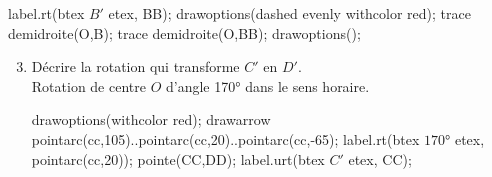 \begin{corrige}
\begin{enumerate}
\begin{Geometrie}[CoinHD={(7u,6u)}]
                label.rt(btex $B'$ etex, BB);    
                drawoptions(dashed evenly withcolor red);
                trace demidroite(O,B);
                trace demidroite(O,BB);
                drawoptions();
            \end{Geometrie}
    \end{enumerate}
    \Coupe 
    \begin{enumerate}            
        \setcounter{enumi}{2}
            \begin{Geometrie}[CoinHD={(7u,6u)}]    
                \enonceTroisiemeGTroisExoDix
                trace rapporteurdouble(O,C,-1);
                drawoptions(withcolor red);
                drawarrow pointarc(cc,150)..pointarc(cc,127.5)..pointarc(cc,105);
                label.ulft(btex $\ang{45}$ etex, pointarc(cc,127.5));    
                pointe(CC);
                label.urt(btex $C'$ etex, CC);
                drawoptions(dashed evenly withcolor red);
                trace demidroite(O,C);
                trace demidroite(O,CC);
                drawoptions();
            \end{Geometrie}
            \begin{Geometrie}[CoinHD={(7u,6u)}]    
                \enonceTroisiemeGTroisExoDix
                trace rapporteurdouble(O,E,-1);
                drawoptions(withcolor red);
                drawarrow pointarc(cc,300)..pointarc(cc,277.5)..pointarc(cc,255);
                label.bot(btex $\ang{45}$ etex, pointarc(cc,277.5));    
                pointe(EE);
                label.lrt(btex $E'$ etex, EE);
                drawoptions(dashed evenly withcolor red);
                trace demidroite(O,E);
                trace demidroite(O,EE);
                drawoptions();
            \end{Geometrie}
            \item Décrire la rotation qui transforme $C'$ en $D'$.\\
        {\red Rotation de centre $O$ d'angle \ang{170} dans le sens horaire.}\\
            \begin{Geometrie}[CoinHD={(7u,6u)}]    
                \enonceTroisiemeGTroisExoDix
                drawoptions(withcolor red);
                drawarrow pointarc(cc,105)..pointarc(cc,20)..pointarc(cc,-65);
                label.rt(btex $\ang{170}$ etex, pointarc(cc,20));    
                pointe(CC,DD);
                label.urt(btex $C'$ etex, CC);

\end{Geometrie}
\end{enumerate}
\end{corrige}
